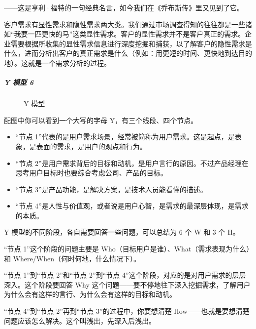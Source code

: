 \documentclass[letterpaper,11pt,english]{sphinxmanual}
\begin{document}
——这是亨利·福特的一句经典名言，如今我们在《乔布斯传》里又见到了它。

客户需求有显性需求和隐性需求两大类。我们通过市场调查得知的往往都是一些诸如“我要一匹更快的马”这类显性需求。客户的显性需求并不是客户真正的需求。企业需要根据所收集的显性需求信息进行深度挖掘和捕获，以了解客户的隐性需求是什么，进而分析出客户的真正需求是什么（例如：用更短的时间、更快地到达目的地）。这就是一个需求分析的过程。


\subparagraph{Y 模型 6\sphinxfootnotemark[466]}
\label{\detokenize{chapter_knowledge/need_analysis:y-6}}%
\begin{footnotetext}[466]\sphinxAtStartFootnote
{}
%
\end{footnotetext}\ignorespaces 
\begin{figure}[H]
\centering
\capstart

\noindent{}
\caption{Y 模型}\label{\detokenize{chapter_knowledge/need_analysis:id16}}\end{figure}

配图中你可以看到一个大写的字母 Y，有三个线段、四个节点。
\begin{itemize}
\item {} 
“节点
1”代表的是用户需求场景，经常被简称为用户需求。这是起点，是表象，是表面的需求，是用户的观点和行为。

\item {} 
“节点
2”是用户需求背后的目标和动机，是用户言行的原因。不过产品经理在思考用户目标时也要综合考虑公司、产品的目标。

\item {} 
“节点 3”是产品功能，是解决方案，是技术人员能看懂的描述。

\item {} 
“节点
4”是人性与价值观，或者说是用户心智，是需求的最深层体现，是需求的本质。

\end{itemize}

Y 模型的不同阶段，各自需要回答一些问题，可以总结为 6 个 W 和 3 个 H。

“节点 1”这个阶段的问题主要是
Who（目标用户是谁）、What（需求表现为什么）和
Where/When（何时何地，什么情况下）。

“节点 1”到“节点 2”和“节点 2”到“节点
4”这个阶段，对应的是对用户需求的层层深入。这个阶段要回答 Why
这个问题——要不停地往下深入挖掘需求，了解用户为什么会有这样的言行、为什么会有这样的目标和动机。

“节点 4”到“节点 2”再到“节点 3”的过程中，你要想清楚
How——也就是要想清楚问题应该怎么解决。这个叫浅出，先深入后浅出。
\end{document}
